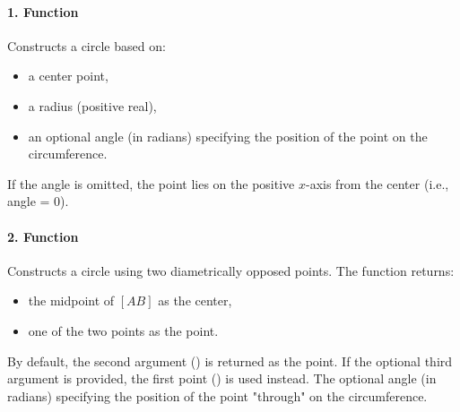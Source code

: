 \paragraph{1. Function \code{through(center, radius, <angle>])}}  
Constructs a circle based on:
\begin{itemize}
  \item a center point,
  \item a radius (positive real),
  \item an optional angle (in radians) specifying the position of the point on the circumference.
\end{itemize}
If the angle is omitted, the point lies on the positive \(x\)-axis from the center (i.e., angle = 0).

\paragraph{2. Function } 
 
Constructs a circle using two diametrically opposed points. The function returns:

\begin{itemize}
  \item the midpoint of \([AB]\) as the center,
  \item one of the two points as the  point.
\end{itemize}

By default, the second argument () is returned as the  point. If the optional third argument  is provided, the first point () is used instead. The optional angle (in radians) specifying the position of the point "through" on the circumference.

\vspace{1em}

\begin{tkzexample}[latex=6cm]
\end{tkzexample}

